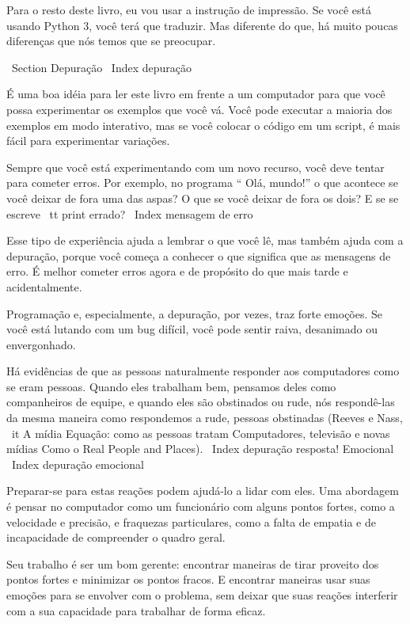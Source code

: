 \documentclass[10pt]{book}
\begin{document}
\begin {itemize}
{Para o resto deste livro, eu vou usar a instrução de impressão. Se você
está usando Python 3, você terá que traduzir. Mas diferente do
que, há muito poucas diferenças que nós temos que se preocupar.


\ Section {} Depuração
\ Index {depuração}

É uma boa idéia para ler este livro em frente a um computador para que você possa
experimentar os exemplos que você vá. Você pode executar a maioria dos exemplos em
modo interativo, mas se você colocar o código em um script, é mais fácil
para experimentar variações.

Sempre que você está experimentando com um novo recurso, você deve tentar
para cometer erros. Por exemplo, no programa `` Olá, mundo!''
o que acontece se você deixar de fora uma das aspas? O que
se você deixar de fora os dois? E se se escreve {\ tt print} errado?
\ Index {mensagem de erro}

Esse tipo de experiência ajuda a lembrar o que você lê, mas também ajuda
com a depuração, porque você começa a conhecer o que significa que as mensagens de erro.
É melhor cometer erros agora e de propósito do que mais tarde
e acidentalmente.

Programação e, especialmente, a depuração, por vezes, traz forte
emoções. Se você está lutando com um bug difícil, você pode
sentir raiva, desanimado ou envergonhado.

Há evidências de que as pessoas naturalmente responder aos computadores como se
eram pessoas. Quando eles trabalham bem, pensamos
deles como companheiros de equipe, e quando eles são obstinados ou rude, nós
respondê-las da mesma maneira como respondemos a rude,
pessoas obstinadas (Reeves e Nass, {\ it A mídia
    Equação: como as pessoas tratam Computadores, televisão e novas mídias
    Como o Real People and Places}).
\ Index {depuração resposta! Emocional}
\ Index {depuração emocional}

Preparar-se para estas reações podem ajudá-lo a lidar com eles.
Uma abordagem é pensar no computador como um funcionário com
alguns pontos fortes, como a velocidade e precisão, e
fraquezas particulares, como a falta de empatia e de incapacidade
de compreender o quadro geral.

Seu trabalho é ser um bom gerente: encontrar maneiras de tirar proveito
dos pontos fortes e minimizar os pontos fracos. E encontrar maneiras
usar suas emoções para se envolver com o problema,
sem deixar que suas reações interferir com a sua capacidade
para trabalhar de forma eficaz.

}
\end{itemize}
\end{document}
